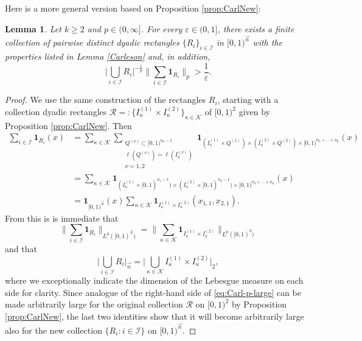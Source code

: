 \documentclass[11pt, reqno]{amsart}
\newtheorem{lemma}[theorem]{Lemma}
\theoremstyle{definition}
\theoremstyle{remark}
\numberwithin{equation}{section}
\newcommand{\vn}{\vec n}
\newcommand{\eps}{\varepsilon}
\newcommand{\one}{\mathbf{1}}
\newcommand{\Babs}[1]{\Big|#1\Big|}
\newcommand{\BNorm}[2]{\Big\|#1\Big\|_{#2}}
\begin{document}
Here is a more general version based on Proposition \ref{prop:CarlNew}:

\begin{lemma} \label{Carleson-p}
Let $k\geq 2$ and $p\in(0,\infty]$. For every $\varepsilon\in(0,1]$,
there exists a finite collection of
pairwise distinct dyadic rectangles $\{R_i\}_{i\in \mathscr I}$
in $[0,1)^{\vec n}$ with the properties listed in Lemma \ref{Carleson} and, in addition,
\begin{equation}\label{eq:Carl-p-large}
  \Babs{\bigcup_{i\in \mathscr I} R_i}^{-\frac1p}\BNorm{\sum_{i\in\mathscr I}\one_{R_i}}{p}>\frac{1}{\eps}.
\end{equation}
\end{lemma}

\begin{proof}
We use the same construction of the rectangles $R_i$, starting with a collection dyadic rectangles $\mathscr R=:\{I_\kappa^{(1)}\times I_{\kappa}^{(2)}\}_{\kappa\in\mathscr K}$ of $[0,1)^2$ given by Proposition \ref{prop:CarlNew}. Then
\begin{equation*}
\begin{split}
  \sum_{i\in\mathscr I}\one_{R_i}(x)
  &=\sum_{\kappa\in\mathscr K}
  \sum_{\substack{ Q^{(\nu)}\subset[0,1)^{n_\nu-1} \\ \ell(Q^{(\nu)})=\ell(I^{(\nu)}_\kappa) \\ \nu=1,2}}
    \one_{(I_\kappa^{(1)}\times Q^{(1)})\times(I_\kappa^{(2)}\times Q^{(2)})\times [0,1)^{n_3+\ldots+n_k}}(x) \\
  &=\sum_{\kappa\in\mathscr K}
    \one_{(I_\kappa^{(1)}\times [0,1)^{n_1-1})\times(I_\kappa^{(2)}\times [0,1)^{n_2-1})\times [0,1)^{n_3+\ldots+n_k}}(x)  \\
    &=\one_{[0,1)^{\vn}}(x)
    \sum_{\kappa\in\mathscr K}\one_{I_\kappa^{(1)}\times I_\kappa^{(2)}}(x_{1,1},x_{2,1}).
\end{split}
\end{equation*}
From this is is immediate that
\begin{equation*}
  \BNorm{\sum_{i\in\mathscr I}\one_{R_i}}{L^p([0,1)^{\vn})}
  =\BNorm{\sum_{\kappa\in\mathscr K}\one_{I^{(1)}_\kappa\times I^{(2)}_\kappa}}{L^p([0,1)^2)}
\end{equation*}
and that
\begin{equation*}
  \Babs{\bigcup_{i\in\mathscr I}R_i}_{\vn}
  =\Babs{\bigcup_{\kappa\in\mathscr K} I^{(1)}_\kappa\times I^{(2)}_\kappa}_{2},
\end{equation*}
where we exceptionally indicate the dimension of the Lebesgue measure on each side for clarity. Since analogue of the right-hand side of \eqref{eq:Carl-p-large} can be made arbitrarily large for the original collection $\mathscr R$ on $[0,1)^2$ by Proposition \ref{prop:CarlNew}, the last two identities show that it will become arbitrarily large also for the new collection $\{R_i:i\in\mathscr I\}$ on $[0,1)^{\vn}$.
\end{proof}
\end{document}
